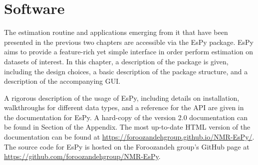 \chapter{Software}
\label{chap:nmrespy}

The estimation routine and applications emerging from it that have been
presented in the previous two chapters are accessible via the \ac{EsPy}
package. \ac{EsPy} aims to provide a feature-rich yet simple interface in order
perform estimation on datasets of interest. In this chapter, a description of
the package is given, including the design choices, a basic description of the
package structure, and a description of the accompanying \ac{GUI}.

A rigorous description of the usage of \ac{EsPy}, including details on
installation, walkthroughs for different data types, and a reference for the
\ac{API} are given in the documentation for \ac{EsPy}. A hard-copy of the
version 2.0 documentation can be found in Section  of the Appendix.
The most up-to-date HTML version of the documentation can be found at
\url{https://foroozandehgroup.github.io/NMR-EsPy/}.
The source code for \ac{EsPy} is hosted on the Foroozandeh group's GitHub page at
\url{https://github.com/foroozandehgroup/NMR-EsPy}.


